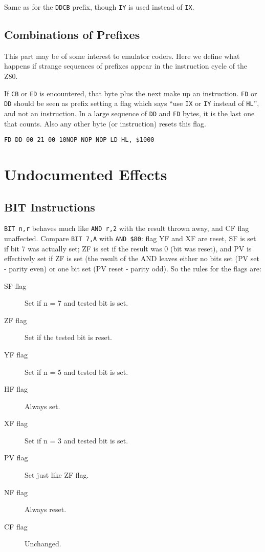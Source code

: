 Same as for the {\tt DDCB} prefix, though {\tt IY} is used instead of {\tt IX}.


\subsection{Combinations of Prefixes}

This part may be of some interest to emulator coders. Here we define what happens if strange sequences of prefixes appear in the instruction cycle of the Z80.

If {\tt CB} or {\tt ED} is encountered, that byte plus the next make up an instruction. {\tt FD} or {\tt DD} should be seen as prefix setting a flag which says ``use {\tt IX} or {\tt IY} instead of {\tt HL}'', and not an instruction. In a large sequence of {\tt DD} and {\tt FD} bytes, it is the last one that counts. Also any other byte (or instruction) resets this flag.

{\tt {\qquad}FD DD 00 21 00 10{\qquad}NOP NOP NOP LD HL, \$1000}




\section{Undocumented Effects}

\subsection{BIT Instructions}
\label{z80_undocumented_flags_bit}

{\tt BIT n,r} behaves much like {\tt AND r,2{\raisebox{1ex}{n}}} with the result thrown away, and CF flag unaffected. Compare {\tt BIT 7,A} with {\tt AND \$80}: flag YF and XF are reset, SF is set if bit 7 was actually set; ZF is set if the result was 0 (bit was reset), and PV is effectively set if ZF is set (the result of the AND leaves either no bits set (PV set - parity even) or one bit set (PV reset - parity odd). So the rules for the flags are:

\begin{description}
	\item[SF flag]
	Set if n = 7 and tested bit is set.

	\item[ZF flag]
	Set if the tested bit is reset.

	\item[YF flag]
	Set if n = 5 and tested bit is set.

	\item[HF flag]
	Always set.

	\item[XF flag]
	Set if n = 3 and tested bit is set.

	\item[PV flag]
	Set just like ZF flag.

	\item[NF flag]
	Always reset. 

	\item[CF flag]
	Unchanged.

\end{description}

